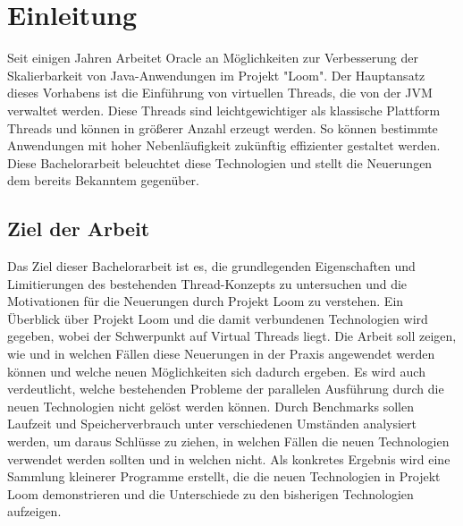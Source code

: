 \chapter{Einleitung}
\label{cha:Einleitung}

    Seit einigen Jahren Arbeitet Oracle an Möglichkeiten zur Verbesserung der Skalierbarkeit von Java-Anwendungen im Projekt "Loom".
    Der Hauptansatz dieses Vorhabens ist die Einführung von virtuellen Threads, die von der JVM verwaltet werden. 
    Diese Threads sind leichtgewichtiger als klassische Plattform Threads und können in größerer Anzahl erzeugt werden.
    So können bestimmte Anwendungen mit hoher Nebenläufigkeit zukünftig effizienter gestaltet werden. Diese Bachelorarbeit 
    beleuchtet diese Technologien und stellt die Neuerungen dem bereits Bekanntem gegenüber.

\section{Ziel der Arbeit}
\label{sec:Ziel}

    Das Ziel dieser Bachelorarbeit ist es, die grundlegenden Eigenschaften und Limitierungen des bestehenden Thread-Konzepts zu untersuchen und die Motivationen für die Neuerungen
    durch Projekt Loom zu verstehen. Ein Überblick über Projekt Loom und die damit verbundenen Technologien wird gegeben, wobei der Schwerpunkt auf Virtual Threads liegt. 
    Die Arbeit soll zeigen, wie und in welchen Fällen diese Neuerungen in der Praxis angewendet werden können und welche neuen Möglichkeiten sich dadurch ergeben. 
    Es wird auch verdeutlicht, welche bestehenden Probleme der parallelen Ausführung durch die neuen Technologien nicht gelöst werden können. 
    Durch Benchmarks sollen Laufzeit und Speicherverbrauch unter verschiedenen Umständen analysiert werden, um daraus Schlüsse zu ziehen, 
    in welchen Fällen die neuen Technologien verwendet werden sollten und in welchen nicht. Als konkretes Ergebnis wird eine Sammlung kleinerer Programme erstellt, 
    die die neuen Technologien in Projekt Loom demonstrieren und die Unterschiede zu den bisherigen Technologien aufzeigen.



